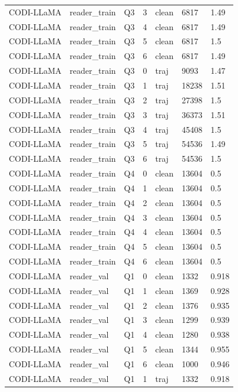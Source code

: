 \begin{longtable}{@{}p{}p{}p{}p{}p{}p{}p{}@{}}
CODI-LLaMA & reader\_train & Q3 & 3 & clean & 6817 & 1.49 \\
CODI-LLaMA & reader\_train & Q3 & 4 & clean & 6817 & 1.49 \\
CODI-LLaMA & reader\_train & Q3 & 5 & clean & 6817 & 1.5 \\
CODI-LLaMA & reader\_train & Q3 & 6 & clean & 6817 & 1.49 \\
CODI-LLaMA & reader\_train & Q3 & 0 & traj & 9093 & 1.47 \\
CODI-LLaMA & reader\_train & Q3 & 1 & traj & 18238 & 1.51 \\
CODI-LLaMA & reader\_train & Q3 & 2 & traj & 27398 & 1.5 \\
CODI-LLaMA & reader\_train & Q3 & 3 & traj & 36373 & 1.51 \\
CODI-LLaMA & reader\_train & Q3 & 4 & traj & 45408 & 1.5 \\
CODI-LLaMA & reader\_train & Q3 & 5 & traj & 54536 & 1.49 \\
CODI-LLaMA & reader\_train & Q3 & 6 & traj & 54536 & 1.5 \\
CODI-LLaMA & reader\_train & Q4 & 0 & clean & 13604 & 0.5 \\
CODI-LLaMA & reader\_train & Q4 & 1 & clean & 13604 & 0.5 \\
CODI-LLaMA & reader\_train & Q4 & 2 & clean & 13604 & 0.5 \\
CODI-LLaMA & reader\_train & Q4 & 3 & clean & 13604 & 0.5 \\
CODI-LLaMA & reader\_train & Q4 & 4 & clean & 13604 & 0.5 \\
CODI-LLaMA & reader\_train & Q4 & 5 & clean & 13604 & 0.5 \\
CODI-LLaMA & reader\_train & Q4 & 6 & clean & 13604 & 0.5 \\
CODI-LLaMA & reader\_val & Q1 & 0 & clean & 1332 & 0.918 \\
CODI-LLaMA & reader\_val & Q1 & 1 & clean & 1369 & 0.928 \\
CODI-LLaMA & reader\_val & Q1 & 2 & clean & 1376 & 0.935 \\
CODI-LLaMA & reader\_val & Q1 & 3 & clean & 1299 & 0.939 \\
CODI-LLaMA & reader\_val & Q1 & 4 & clean & 1280 & 0.938 \\
CODI-LLaMA & reader\_val & Q1 & 5 & clean & 1344 & 0.955 \\
CODI-LLaMA & reader\_val & Q1 & 6 & clean & 1000 & 0.946 \\
CODI-LLaMA & reader\_val & Q1 & 1 & traj & 1332 & 0.918 \\

\end{longtable}
